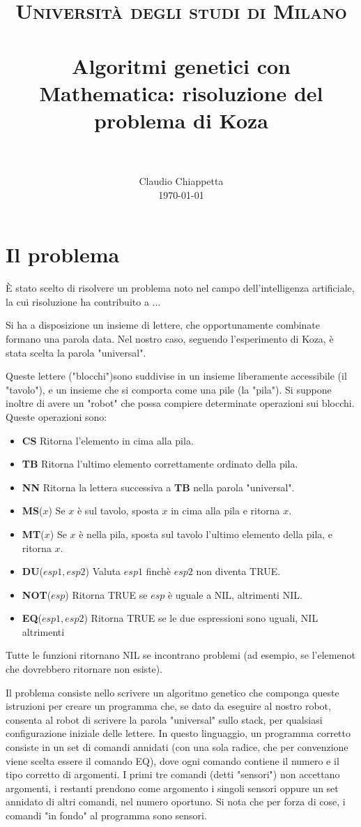 \documentclass[paper=a4, fontsize=11pt]{scrartcl}
\title{
		\usefont{OT1}{bch}{b}{n}
		\normalfont \normalsize \textsc{Università degli studi di Milano} \\ [25pt]
		\horrule{0.5pt} \\[0.4cm]
		\huge Algoritmi genetici con Mathematica: risoluzione del problema di Koza \\
		\horrule{2pt} \\[0.5cm]
}
\author{
		\normalfont 								\normalsize
        Claudio Chiappetta\\[-3pt]		\normalsize
        \today
}
\date{}
\numberwithin{equation}{section}		%
\numberwithin{figure}{section}			%
\numberwithin{table}{section}				%
\begin{document}
\maketitle
\section{Il problema}
È stato scelto di risolvere un problema noto nel campo dell'intelligenza artificiale, la cui risoluzione ha contribuito a ...

Si ha a disposizione un insieme di lettere, che opportunamente combinate formano una parola data. Nel nostro caso, seguendo l'esperimento di Koza, è stata scelta la parola "universal".

Queste lettere ("blocchi")sono suddivise in un insieme liberamente accessibile (il "tavolo"), e un insieme che si comporta come una pile (la "pila"). Si suppone inoltre di avere un "robot" che possa compiere determinate operazioni sui blocchi. Queste operazioni sono:
\begin{itemize}
\item {\textbf{ CS}} Ritorna l'elemento in cima alla pila.
\item {\textbf{ TB}} Ritorna l'ultimo elemento correttamente ordinato della pila.
\item {\textbf{ NN}} Ritorna la lettera successiva a \textbf{TB} nella parola "universal".
\item {\textbf{ MS}($x$)} Se $x$ è sul tavolo, sposta $x$ in cima alla pila e ritorna $x$.
\item {\textbf{ MT}($x$)} Se $x$ è nella pila, sposta sul tavolo l'ultimo elemento della pila, e ritorna $x$.
\item {\textbf{ DU}($esp1, esp2$)} Valuta $esp1$ finchè $esp2$ non diventa TRUE.
\item {\textbf{ NOT}($esp$)} Ritorna TRUE se $esp$ è uguale a NIL, altrimenti NIL.
\item {\textbf{ EQ}($esp1,esp2$)} Ritorna TRUE se le due espressioni sono uguali, NIL altrimenti
\end{itemize}

Tutte le funzioni ritornano NIL se incontrano problemi (ad esempio, se l'elemenot che dovrebbero ritornare non esiste).

Il problema consiste nello scrivere un algoritmo genetico che componga queste istruzioni per creare un programma che, se dato da eseguire al nostro robot, consenta al robot di scrivere la parola "universal" sullo stack, per qualsiasi configurazione iniziale delle lettere. In questo linguaggio, un programma corretto consiste in un set di comandi annidati (con una sola radice, che per convenzione viene scelta essere il comando EQ), dove ogni comando contiene il numero e il tipo corretto di argomenti. I primi tre comandi (detti "sensori") non accettano argomenti, i restanti prendono come argomento i singoli sensori oppure un set annidato di altri comandi, nel numero oportuno. 
Si nota che per forza di cose, i comandi "in fondo" al programma sono sensori.
\end{document}
